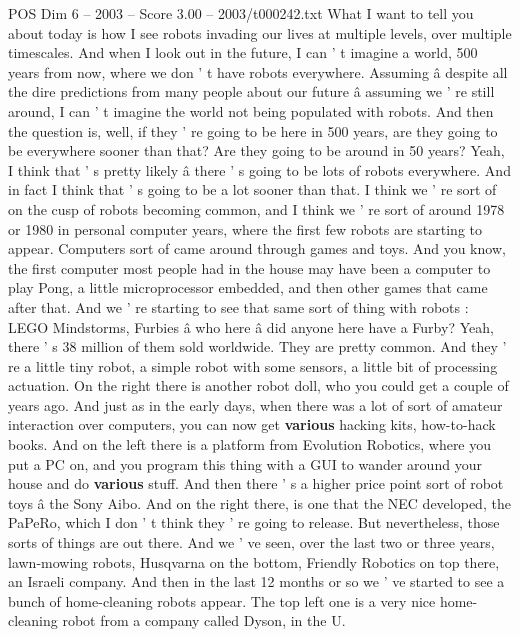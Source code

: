 \begin{textsample}{POS Dim 6 – 2003 – Score 3.00 – 2003/t000242.txt}  \label{ex:f6_pos_022}
What I want to tell you about today is how I see robots invading our lives at multiple levels, over multiple timescales.
And when I look out in the future, I can ' t imagine a world, 500 years from now, where we don ' t have robots everywhere.
Assuming â despite all the dire predictions from many people about our future â assuming we ' re still around, I can ' t imagine the world not being populated with robots.
And then the question is, well, if they ' re going to be here in 500 years, are they going to be everywhere sooner than that?
Are they going to be around in 50 years?
Yeah, I think that ' s pretty likely â there ' s going to be lots of robots everywhere.
And in fact I think that ' s going to be a lot sooner than that.
I think we ' re sort of on the cusp of robots becoming common, and I think we ' re sort of around 1978 or 1980 in personal computer years, where the first few robots are starting to appear.
Computers sort of came around through games and toys.
And you know, the first computer most people had in the house may have been a computer to play Pong, a little microprocessor embedded, and then other games that came after that.
And we ' re starting to see that same sort of thing with robots : LEGO Mindstorms, Furbies â who here â did anyone here have a Furby?
Yeah, there ' s 38 million of them sold worldwide.
They are pretty common.
And they ' re a little tiny robot, a simple robot with some sensors, a little bit of processing actuation.
On the right there is another robot doll, who you could get a couple of years ago.
And just as in the early days, when there was a lot of sort of amateur interaction over computers, you can now get \textbf{various} hacking kits, how-to-hack books.
And on the left there is a platform from Evolution Robotics, where you put a PC on, and you program this thing with a GUI to wander around your house and do \textbf{various} stuff.
And then there ' s a higher price point sort of robot toys â the Sony Aibo.
And on the right there, is one that the NEC developed, the PaPeRo, which I don ' t think they ' re going to release.
But nevertheless, those sorts of things are out there.
And we ' ve seen, over the last two or three years, lawn-mowing robots, Husqvarna on the bottom, Friendly Robotics on top there, an Israeli company.
And then in the last 12 months or so we ' ve started to see a bunch of home-cleaning robots appear.
The top left one is a very nice home-cleaning robot from a company called Dyson, in the U.

\end{textsample}
